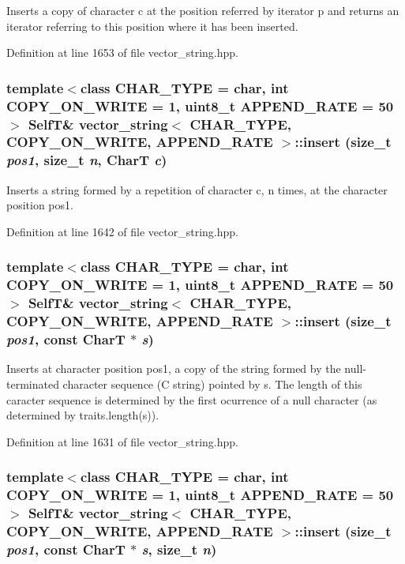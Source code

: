 Inserts a copy of character c at the position referred by iterator p and returns an iterator referring to this position where it has been inserted. 

Definition at line 1653 of file vector\_\-string.hpp.\hypertarget{classvector__string_c1a1bf0ea437e457a0b8a6ea543e5a7a}{
\subsubsection[{insert}]{\setlength{\rightskip}{0pt plus 5cm}template$<$class CHAR\_\-TYPE  = char, int COPY\_\-ON\_\-WRITE = 1, uint8\_\-t APPEND\_\-RATE = 50$>$ {\bf SelfT}\& {\bf vector\_\-string}$<$ CHAR\_\-TYPE, COPY\_\-ON\_\-WRITE, APPEND\_\-RATE $>$::insert (size\_\-t {\em pos1}, \/  size\_\-t {\em n}, \/  CharT {\em c})}}
\label{classvector__string_c1a1bf0ea437e457a0b8a6ea543e5a7a}


Inserts a string formed by a repetition of character c, n times, at the character position pos1. 

Definition at line 1642 of file vector\_\-string.hpp.\hypertarget{classvector__string_04f6c42efcbfd652e14268771f67df94}{
\subsubsection[{insert}]{\setlength{\rightskip}{0pt plus 5cm}template$<$class CHAR\_\-TYPE  = char, int COPY\_\-ON\_\-WRITE = 1, uint8\_\-t APPEND\_\-RATE = 50$>$ {\bf SelfT}\& {\bf vector\_\-string}$<$ CHAR\_\-TYPE, COPY\_\-ON\_\-WRITE, APPEND\_\-RATE $>$::insert (size\_\-t {\em pos1}, \/  const CharT $\ast$ {\em s})}}
\label{classvector__string_04f6c42efcbfd652e14268771f67df94}


Inserts at character position pos1, a copy of the string formed by the null-terminated character sequence (C string) pointed by s. The length of this caracter sequence is determined by the first ocurrence of a null character (as determined by traits.length(s)). 

Definition at line 1631 of file vector\_\-string.hpp.\hypertarget{classvector__string_74c7a4822a48e44db82676e5601d3afe}{
\subsubsection[{insert}]{\setlength{\rightskip}{0pt plus 5cm}template$<$class CHAR\_\-TYPE  = char, int COPY\_\-ON\_\-WRITE = 1, uint8\_\-t APPEND\_\-RATE = 50$>$ {\bf SelfT}\& {\bf vector\_\-string}$<$ CHAR\_\-TYPE, COPY\_\-ON\_\-WRITE, APPEND\_\-RATE $>$::insert (size\_\-t {\em pos1}, \/  const CharT $\ast$ {\em s}, \/  size\_\-t {\em n})}}
\label{classvector__string_74c7a4822a48e44db82676e5601d3afe}


